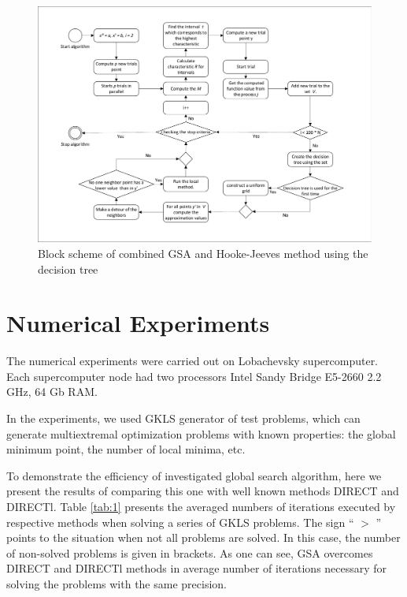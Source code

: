 \documentclass{svproc}
\begin{document}
\begin{figure}[ht!]
	
	\begin{center} 
				\begin{minipage}[h]{0.9\linewidth} 			\includegraphics[width=1\linewidth]{figure/fig3.pdf}
					 			\caption{Block scheme of combined GSA and Hooke-Jeeves method using the  decision tree} %
					 			\label{fig:fig3}
				 \end{minipage}
	\end{center}
\end{figure}





\section{Numerical Experiments}\label{SecR}


The numerical experiments were carried out on Lobachevsky supercomputer. Each supercomputer  node had two processors Intel Sandy Bridge E5-2660 2.2 GHz, 64 Gb RAM. 

In the experiments, we used GKLS generator of test problems, which can generate multiextremal  optimization problems with known properties: the global minimum point, the number of local minima,  etc.

To demonstrate the efficiency of  investigated global search algorithm, here we present the results of  comparing this one with well known methods DIRECT and DIRECTl. Table \ref{tab:1} presents the averaged numbers of iterations executed by respective methods when  solving a series of GKLS problems. The sign `` $>$ '' points to the situation when not all problems are  solved. In this case, the number of non-solved problems is given in brackets. As one can see,  GSA overcomes DIRECT and DIRECTl methods in average number of iterations necessary for solving the problems with the same precision.
\end{document}
